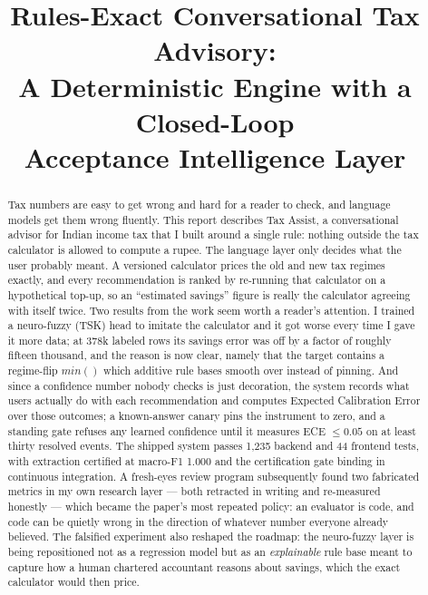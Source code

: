 \documentclass[conference]{IEEEtran}
\begin{document}
\title{Rules-Exact Conversational Tax Advisory:\\
A Deterministic Engine with a Closed-Loop\\Acceptance Intelligence Layer}

\author{
}

\maketitle
\thispagestyle{plain}

\begin{abstract}
\normalfont\normalsize
Tax numbers are easy to get wrong and hard for a reader to check, and
language models get them wrong fluently. This report describes Tax
Assist, a conversational advisor for Indian income tax that I built
around a single rule: nothing outside the tax calculator is allowed to
compute a rupee. The language layer only decides what the user
probably meant. A versioned calculator prices the old and new tax
regimes exactly, and every recommendation is ranked by re-running that
calculator on a hypothetical top-up, so an ``estimated savings''
figure is really the calculator agreeing with itself twice. Two
results from the work seem worth a reader's attention. I trained a
neuro-fuzzy (TSK) head to imitate the calculator and it got worse
every time I gave it more data; at 378k labeled rows its savings error
was off by a factor of roughly fifteen thousand, and the reason is now
clear, namely that the target contains a regime-flip $min()$ which
additive rule bases smooth over instead of pinning. And since a
confidence number nobody checks is just decoration, the system records
what users actually do with each recommendation and computes Expected
Calibration Error over those outcomes; a known-answer canary pins the
instrument to zero, and a standing gate refuses any learned confidence
until it measures ECE $\leq 0.05$ on at least thirty resolved events.
The shipped system passes 1{,}235 backend and 44 frontend tests, with
extraction certified at macro-F1 1.000 and the certification gate
binding in continuous integration. A fresh-eyes review program
subsequently found two fabricated metrics in my own research layer ---
both retracted in writing and re-measured honestly --- which became the
paper's most repeated policy: an evaluator is code, and code can be
quietly wrong in the direction of whatever number everyone already
believed. The falsified experiment also reshaped the roadmap: the
neuro-fuzzy layer is being repositioned not
as a regression model but as an \emph{explainable} rule base meant to
capture how a human chartered accountant reasons about savings, which
the exact calculator would then price.
\end{abstract}
\end{document}
